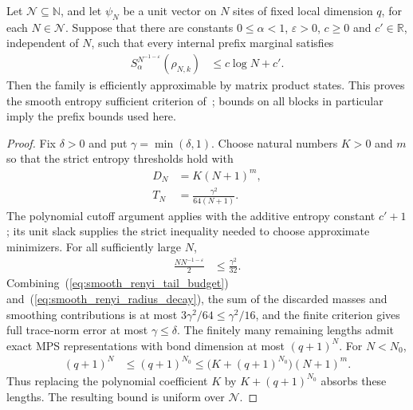\begin{lemma}
    \label{thm:smooth_renyi_family_approximation}
    \leanok
    Let $\mathcal N\subseteq\mathbb N$, and let $\psi_N$ be a unit vector on
    $N$ sites of fixed local dimension $q$, for each $N\in\mathcal N$.
    Suppose that there are constants $0\le\alpha<1$, $\varepsilon>0$,
    $c\ge0$ and $c'\in\mathbb R$, independent of $N$, such that every
    internal prefix marginal satisfies
    \begin{align}
        S_\alpha^{N^{-1-\varepsilon}}(\rho_{N,k}) & \le c\log N+c'.
        \label{eq:smooth_renyi_family_bound}
    \end{align}
    Then the family is efficiently approximable by matrix product states.
    This proves the smooth entropy sufficient criterion
    of~\cite{Schuch2008EntropyScaling}; bounds on all blocks in
    particular imply the prefix bounds used here.
\end{lemma}
\begin{proof}
    \leanok
    Fix $\delta>0$ and put $\gamma=\min(\delta,1)$. Choose natural numbers
    $K>0$ and $m$ so that the strict entropy thresholds hold with
    \begin{align}
        D_N & =K(N+1)^m,\label{eq:smooth_renyi_bond_cutoff}                 \\
        T_N & =\frac{\gamma^2}{64(N+1)}.\label{eq:smooth_renyi_tail_budget}
    \end{align}
    The polynomial cutoff argument applies with the additive entropy
    constant $c'+1$; its unit slack supplies the strict inequality needed
    to choose approximate minimizers. For all sufficiently large $N$,
    \begin{align}
        \frac{N N^{-1-\varepsilon}}2 & \le\frac{\gamma^2}{32}.
        \label{eq:smooth_renyi_radius_decay}
    \end{align}
    Combining~(\ref{eq:smooth_renyi_tail_budget}) and~(\ref{eq:smooth_renyi_radius_decay}), the sum of the discarded masses and smoothing contributions is
    at most $3\gamma^2/64\le\gamma^2/16$, and the finite criterion gives
    full trace-norm error at most $\gamma\le\delta$.
    The finitely many remaining lengths admit exact MPS representations
    with bond dimension at most $(q+1)^N$. For $N<N_0$,
    \begin{align}
        (q+1)^N
         & \le (q+1)^{N_0}
        \le \bigl(K+(q+1)^{N_0}\bigr)(N+1)^m.
        \label{eq:smooth_renyi_short_length_bond}
    \end{align}
    Thus replacing the polynomial coefficient $K$ by
    $K+(q+1)^{N_0}$ absorbs these lengths. The resulting bound is uniform
    over $\mathcal N$.
\end{proof}
